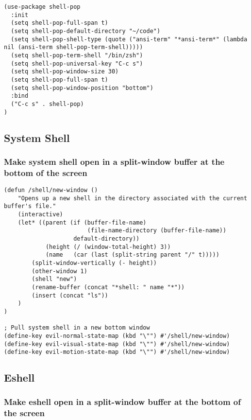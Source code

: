 \documentclass[11pt]{article}
\begin{document}
\begin{verbatim}
(use-package shell-pop
  :init
  (setq shell-pop-full-span t)
  (setq shell-pop-default-directory "~/code")
  (setq shell-pop-shell-type (quote ("ansi-term" "*ansi-term*" (lambda nil (ansi-term shell-pop-term-shell)))))
  (setq shell-pop-term-shell "/bin/zsh")
  (setq shell-pop-universal-key "C-c s")
  (setq shell-pop-window-size 30)
  (setq shell-pop-full-span t)
  (setq shell-pop-window-position "bottom")
  :bind
  ("C-c s" . shell-pop)
)
\end{verbatim}

\subsection*{System Shell}
\label{sec:orgab4e8a2}
\subsubsection*{Make system shell open in a split-window buffer at the bottom of the screen}
\label{sec:org0769584}

\begin{verbatim}
(defun /shell/new-window ()
    "Opens up a new shell in the directory associated with the current buffer's file."
    (interactive)
    (let* ((parent (if (buffer-file-name)
                        (file-name-directory (buffer-file-name))
                    default-directory))
            (height (/ (window-total-height) 3))
            (name   (car (last (split-string parent "/" t)))))
        (split-window-vertically (- height))
        (other-window 1)
        (shell "new")
        (rename-buffer (concat "*shell: " name "*"))
        (insert (concat "ls"))
    )
)

; Pull system shell in a new bottom window
(define-key evil-normal-state-map (kbd "\"") #'/shell/new-window)
(define-key evil-visual-state-map (kbd "\"") #'/shell/new-window)
(define-key evil-motion-state-map (kbd "\"") #'/shell/new-window)
\end{verbatim}


\subsection*{Eshell}
\label{sec:orgefd4be0}

\subsubsection*{Make eshell open in a split-window buffer at the bottom of the screen}
\label{sec:orgba4240a}
\end{document}
